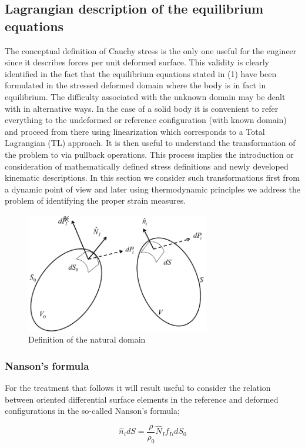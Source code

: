 \subsection{Lagrangian description of the equilibrium equations}
The conceptual definition of Cauchy stress is the only one useful for the engineer since it describes forces per unit deformed surface.  This validity is clearly identified in the fact that the equilibrium equations stated in (1) have been formulated in the stressed deformed domain   where the body is in fact in equilibrium.  The difficulty associated with the unknown domain may be dealt with in alternative ways.  In the case of a solid body it is convenient to refer everything to the undeformed or reference configuration (with known domain)   and proceed from there using linearization which corresponds to a Total Lagrangian (TL) approach.  It is then useful to understand the transformation of the problem to   via pullback operations.  This process implies the introduction or consideration of mathematically  defined stress definitions and newly developed kinematic descriptions.  In this section we consider such transformations first from a dynamic point of view and later using thermodynamic principles we address the problem of identifying the proper strain measures.
\begin{figure}[h]
\centering
\includegraphics[width=8cm]{img/figure1_2.pdf}
\caption{Definition of the natural domain}
\label{fig:natural large domain}
\end{figure}

\subsubsection*{Nanson's formula}
For the treatment that follows it will result useful to consider the relation between oriented differential surface elements in the reference and deformed configurations in the so-called Nanson's formula;

\begin{equation}
\hat{n}_{i}dS=\frac{\rho}{\rho _0}\hat{N}_I f_{Ii}dS_0
\label{nanson}
\end{equation}

